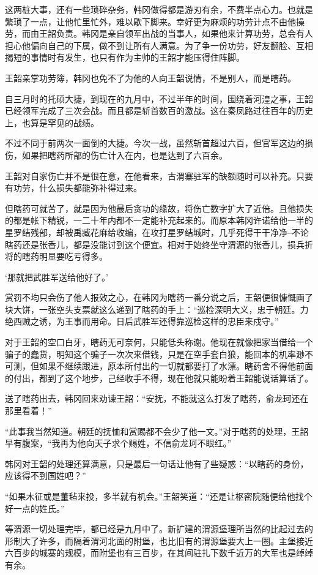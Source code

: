 这两桩大事，还有一些琐碎杂务，韩冈做得都是游刃有余，不费半点心力。也就是繁琐了一点，让他忙里忙外，难以歇下脚来。幸好更为麻烦的功劳计点不由他操劳，而由王韶负责。韩冈是亲自领军出战的当事人，如果他来计算功劳，总会有人担心他偏向自己的下属，做不到让所有人满意。为了争一份功劳，好友翻脸、互相揭短的事情时有发生，也只有作为主帅的王韶才能压得住阵脚。

王韶亲掌功劳簿，韩冈也免不了为他的人向王韶说情，不是别人，而是瞎药。

自三月时的托硕大捷，到现在的九月中，不过半年的时间，围绕着河湟之事，王韶已经领军完成了三次会战。而且都是斩首数百的激战。这在秦凤路过往百年的历史上，也算是罕见的战绩。

不过不同于前两次一面倒的大捷。今次一战，虽然斩首超过六百，但官军这边的损伤，如果把瞎药所部的伤亡计入在内，也是达到了六百余。

王韶对自家伤亡并不是很在意，在他看来，古渭寨驻军的缺额随时可以补充。只要有功劳，什么损失都能弥补得过来。

但瞎药可就苦了，就是因为他最后贪功的缘故，将伤亡数字扩大了近倍。且他损失的都是帐下精锐，一二十年内都不一定能补充起来的。而原本韩冈许诺给他一半的星罗结残部，却被禹臧花麻给收编，在攻打星罗结城时，几乎死得干干净净--不论瞎药还是张香儿，都是没能讨到这个便宜。相对于始终坐守渭源的张香儿，损兵折将的瞎药明显要吃亏得多。

‘那就把武胜军送给他好了。’

赏罚不均只会伤了他人报效之心，在韩冈为瞎药一番分说之后，王韶便很慷慨画了块大饼，一张空头支票就这么递到了瞎药的手上：“巡检深明大义，忠于朝廷。力绝西贼之诱，为王事而用命。日后武胜军还得靠巡检这样的忠臣来戍守。”

对于王韶的空口白牙，瞎药无可奈何，只能低头称谢。他现在就像把家当借给一个骗子的蠢货，明知这个骗子一次次来借钱，只是在空手套白狼，能回本的机率渺不可测，但如果不继续跟进，原本所付出的一切就都要打了水漂。瞎药舍不得他前面的付出，都到了这个地步，己经收手不得，现在他就只能盼着王韶能说话算话了。

送了瞎药出去，韩冈回来劝谏王韶：“安抚，不能就这么打发了瞎药，俞龙珂还在那里看着！”

“此事我当然知道。朝廷的抚恤和赏赐都不会少了他一文。”对于瞎药的处理，王韶早有腹案，“我再为他向天子求个赐姓，不信俞龙珂不眼红。”

韩冈对王韶的处理还算满意，只是最后一句话让他有了些疑惑：“以瞎药的身份，应该得不到国姓吧？”

“如果木征或是董毡来投，多半就有机会。”王韶笑道：“还是让枢密院随便给他找个好一点的姓氏。”

等渭源一切处理完毕，都已经是九月中了。新扩建的渭源堡理所当然的比起过去的形制大了许多，而隔着渭河北面的附堡，也比旧有的渭源堡要大上一圈。主堡接近六百步的城寨的规模，而附堡也有三百步，在其间驻扎下数千近万的大军也是绰绰有余。

